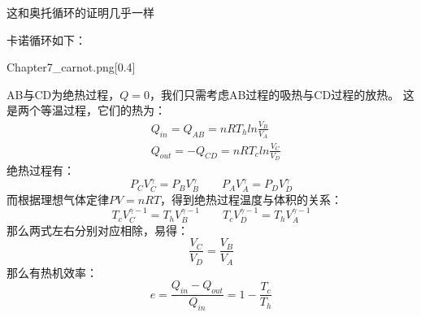 \documentclass{Physics_H_Notes}
\begin{document}
        \begin{prove}
            这和奥托循环的证明几乎一样

            卡诺循环如下：
            \begin{singlefigure}{Chapter7_carnot.png}[0.4]
            \end{singlefigure}
            AB与CD为绝热过程，$Q = 0$，我们只需考虑AB过程的吸热与CD过程的放热。
            这是两个等温过程，它们的热为：
            \begin{equation}
                \begin{aligned}
                    &Q_{in} = Q_{AB} = nRT_{h}ln\frac{V_B}{V_A}\\
                    &Q_{out} = -Q_{CD} = nRT_{c}ln\frac{V_C}{V_D}
                \end{aligned}
                \nonumber
            \end{equation}
            绝热过程有：
            \begin{equation}
                P_{C}V_{C}^{\gamma} = P_{B}V_{B}^{\gamma} \qquad   P_{A}V_{A}^{\gamma} = P_{D}V_{D}^{\gamma}
                \nonumber
            \end{equation}
            而根据理想气体定律$PV=nRT$，得到绝热过程温度与体积的关系：
            \begin{equation}
                T_{c}V_{C}^{\gamma-1} = T_{h}V_{B}^{\gamma-1} \qquad T_{c}V_{D}^{\gamma-1} = T_{h}V_{A}^{\gamma-1}
                \nonumber
            \end{equation}
            那么两式左右分别对应相除，易得：
            \begin{equation}
                \frac{V_C}{V_D} = \frac{V_B}{V_A}
                \nonumber
            \end{equation}
            那么有热机效率：
            \begin{equation}
                e = \frac{Q_{in}-Q_{out}}{Q_{in}} = 1 - \frac{T_{c}}{T_{h}}
            \end{equation}
        \end{prove}
\end{document}
